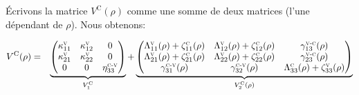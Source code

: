 \documentclass[12pt,a4paper,openany,oneside]{book}
\begin{document}
{{Écrivons la matrice $V^{\textrm{C}}(\rho)$ comme une somme de deux matrices (l'une dépendant de $\rho$).
Nous obtenons:
\renewcommand{\arraystretch}{1.5}
{\setlength{\jot}{2cm}
  \begin{eqnarray*}
   V^{\textrm{C}}(\rho)  
 & = &\underbrace{\begin{pmatrix}
                            \kappa^{\textsc{v}}_{11} & \kappa^{\textsc{v}}_{12} & 0\\
                  \kappa^{\textsc{v}}_{21} & \kappa^{\textsc{v}}_{22} & 0\\
                                         0 & 0                        & \eta^{\textsc{c-v}}_{33}
         \end{pmatrix}}_{V_{1}^{\textrm{C}}} + \underbrace{\begin{pmatrix}
\Lambda^{\textsc{v}}_{11}(\rho)+\zeta^{\textsc{c}}_{11}(\rho) & \Lambda^{\textsc{v}}_{12}(\rho)+\zeta^{\textsc{c}}_{12}(\rho)   & \gamma^{\textsc{v-c}}_{13}(\rho)\\
\Lambda^{\textsc{v}}_{21}(\rho)+\zeta^{\textsc{c}}_{21}(\rho) & \Lambda^{\textsc{v}}_{22}(\rho)+\zeta^{\textsc{c}}_{22}(\rho)   & \gamma^{\textsc{v-c}}_{23}(\rho)\\
\gamma^{\textsc{c-v}}_{31}(\rho) & \gamma^{\textsc{c-v}}_{32}(\rho) & \Lambda^{\textsc{c}}_{33}(\rho)+\zeta^{\textsc{v}}_{33}(\rho)
         \end{pmatrix}}_{V_{2}^{\textrm{C}}(\rho)}     
  \end{eqnarray*}
  {\setlength{\jot}{1cm}
 \renewcommand{\arraystretch}{1}

}}}}
\end{document}
